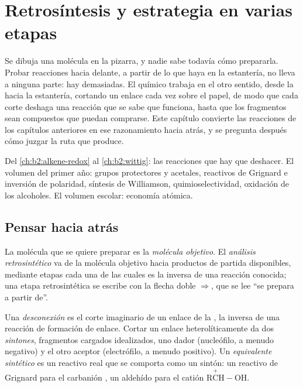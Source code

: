 \chapter{Retrosíntesis y estrategia en varias etapas}\label{ch:b2:retrosynthesis}

Se dibuja una molécula en la pizarra, y nadie sabe todavía cómo prepararla. Probar reacciones hacia delante, a partir
de lo que haya en la estantería, no lleva a ninguna parte: hay demasiadas. El químico trabaja en el otro sentido, desde la
 hacia la estantería, cortando un enlace cada vez sobre el papel, de modo que cada corte deshaga una reacción que
se sabe que funciona, hasta que los fragmentos sean compuestos que puedan comprarse. Este capítulo convierte las reacciones de
los capítulos anteriores en ese razonamiento hacia atrás, y se pregunta después cómo juzgar la ruta que produce.

\begin{recall}
Del \cref{ch:b2:alkene-redox} al \cref{ch:b2:wittig}: las reacciones que hay que deshacer. El volumen del primer año:
grupos protectores y acetales, reactivos de Grignard e inversión de polaridad, síntesis de Williamson,
quimioselectividad, oxidación de los alcoholes. El volumen escolar: economía atómica.
\end{recall}

\section{Pensar hacia atrás}

\begin{definition}\label{def:b2:retrosynthesis:analysis}
La molécula que se quiere preparar es la \emph{molécula objetivo}. El \emph{análisis retrosintético}
 va de la molécula objetivo hacia productos de partida disponibles,
mediante etapas cada una de las cuales es la inversa de una reacción conocida; una etapa retrosintética se escribe con la
flecha doble $\Rightarrow$, que se lee ``se prepara a partir de''.
\end{definition}

\begin{definition}\label{def:b2:retrosynthesis:disconnection}
Una \emph{desconexión} es el corte imaginario de un enlace de la , la
inversa de una reacción de formación de enlace. Cortar un enlace heterolíticamente da dos \emph{sintones},
fragmentos cargados idealizados, uno dador (nucleófilo, a menudo negativo) y el otro aceptor
(electrófilo, a menudo positivo). Un \emph{equivalente sintético} es un
reactivo real que se comporta como un sintón: un reactivo de Grignard para el carbanión , un aldehído para el
catión $\mathrm{R\overset{+}{C}H{-}OH}$.
\end{definition}

